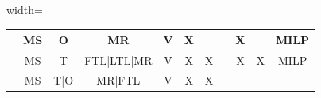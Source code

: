 \begin{table}[h!]
\begin{adjustbox}{width=\textwidth}
\begin{tabular}{|c|c|c|c|c|c|c|l|c|c|c|}
      \autocite{Hein2016QuantitativeProblem}                                             &
      MS                                                                                 &
      O                                                                                  &
      MR                                                                                 &
      V                                                                                  &
      X                                                                                  &
                                                                                         &                &
      X                                                                                  &
                                                                                         &
      MILP                                                                                                                                              \\ \hline
      \autocite{Diaz-Madronero2017ADecisions}                                            &
      MS                                                                                 &
      T                                                                                  &
      FTL|LTL|MR                                                                         &
      V                                                                                  &
      X                                                                                  &
      X                                                                                  &                &
      X                                                                                  &
      X                                                                                  &
      MILP                                                                                                                                              \\ \hline
      \autocite{Meyer2018TransportIndustry}                                              & MS
                                                                                         & T|O
                                                                                         & MR|FTL
                                                                                         & V
                                                                                         & X
                                                                                         & X

\end{tabular}
\end{adjustbox}
\end{table}
